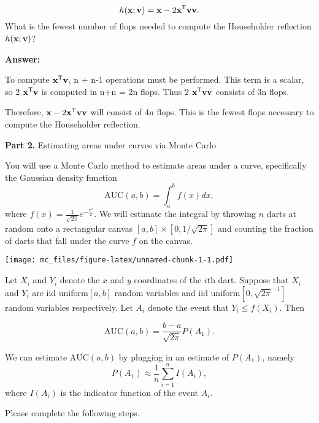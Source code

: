 \documentclass[
]{article}
\begin{document}
\[
h({\bm{\mathbf{\MakeLowercase{x}}}}; {\bm{\mathbf{\MakeLowercase{v}}}}) = {\bm{\mathbf{\MakeLowercase{x}}}} - 2 {\bm{\mathbf{\MakeLowercase{x}}}}^{\sf T}{\bm{\mathbf{\MakeLowercase{v}}}}{\bm{\mathbf{\MakeLowercase{v}}}}.
\] What is the fewest number of flops needed to compute the Householder
reflection
\(h({\bm{\mathbf{\MakeLowercase{x}}}}; {\bm{\mathbf{\MakeLowercase{v}}}})\)?

\textbf{Answer:}

To compute
\({\bm{\mathbf{\MakeLowercase{x}}}}^{\sf T}{\bm{\mathbf{\MakeLowercase{v}}}}\),
n + n-1 operations must be performed. This term is a scalar, so 2
\({\bm{\mathbf{\MakeLowercase{x}}}}^{\sf T}{\bm{\mathbf{\MakeLowercase{v}}}}\)
is computed in n+n = 2n flops. Thus 2
\({\bm{\mathbf{\MakeLowercase{x}}}}^{\sf T}{\bm{\mathbf{\MakeLowercase{v}}}}{\bm{\mathbf{\MakeLowercase{v}}}}\)
consists of 3n flops.

Therefore,
\({\bm{\mathbf{\MakeLowercase{x}}}} - 2{\bm{\mathbf{\MakeLowercase{x}}}}^{\sf T}{\bm{\mathbf{\MakeLowercase{v}}}}{\bm{\mathbf{\MakeLowercase{v}}}}\)
will consist of 4n flops. This is the fewest flops necessary to compute
the Householder reflection.

\textbf{Part 2.} Estimating areas under curves via Monte Carlo

You will use a Monte Carlo method to estimate areas under a curve,
specifically the Gaussian density function \[
\text{AUC}(a,b) = \int_a^b f(x)dx,
\] where \(f(x) = \frac{1}{\sqrt{2\pi}}e^{-\frac{x^2}{2}}\). We will
estimate the integral by throwing \(n\) darts at random onto a
rectangular canvas \([a,b] \times [0, 1/\sqrt{2\pi}]\) and counting the
fraction of darts that fall under the curve \(f\) on the canvas.

\texttt{[image: mc\_files/figure-latex/unnamed-chunk-1-1.pdf]}

Let \(X_i\) and \(Y_i\) denote the \(x\) and \(y\) coordinates of the
\(i\)th dart. Suppose that \(X_i\) and \(Y_i\) are iid uniform\([a,b]\)
random variables and iid uniform\([0,\sqrt{2\pi}^{-1}]\) random
variables respectively. Let \(A_i\) denote the event that
\(Y_i \leq f(X_i)\). Then

\[
\text{AUC}(a,b) =  \frac{b-a}{\sqrt{2\pi}} P(A_1).
\]

We can estimate \(\text{AUC}(a,b)\) by plugging in an estimate of
\(P(A_1)\), namely \[
P(A_1) \approx \frac{1}{n}\sum_{i=1}^n I(A_i),
\] where \(I(A_i)\) is the indicator function of the event \(A_i\).

Please complete the following steps.
\end{document}
